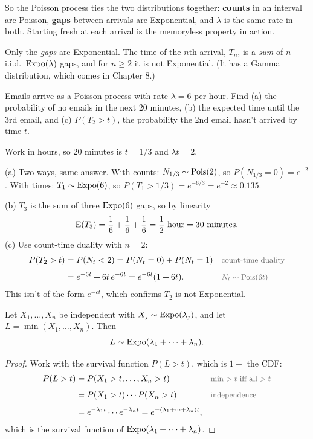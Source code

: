 \begin{remark}
So the Poisson process ties the two distributions together: \textbf{counts} in an interval are Poisson, \textbf{gaps} between arrivals are Exponential, and $\lambda$ is the same rate in both. Starting fresh at each arrival is the memoryless property in action.
\end{remark}

\begin{pitfall}
Only the \emph{gaps} are Exponential. The time of the $n$th arrival, $T_n$, is a \emph{sum} of $n$ i.i.d.\ $\operatorname{Expo}(\lambda)$ gaps, and for $n \ge 2$ it is not Exponential. (It has a Gamma distribution, which comes in Chapter 8.)
\end{pitfall}

\begin{example}\label{ex:emailproc}
Emails arrive as a Poisson process with rate $\lambda = 6$ per hour. Find (a) the probability of no emails in the next $20$ minutes, (b) the expected time until the 3rd email, and (c) $P(T_2 > t)$, the probability the 2nd email hasn't arrived by time $t$.
\end{example}
\begin{solution}
Work in hours, so $20$ minutes is $t = 1/3$ and $\lambda t = 2$.

(a) Two ways, same answer. With counts: $N_{1/3} \sim \operatorname{Pois}(2)$, so $P(N_{1/3} = 0) = e^{-2}$. With times: $T_1 \sim \operatorname{Expo}(6)$, so $P(T_1 > 1/3) = e^{-6/3} = e^{-2} \approx 0.135$.

(b) $T_3$ is the sum of three $\operatorname{Expo}(6)$ gaps, so by linearity
\[
\operatorname{E}(T_3) = \frac{1}{6} + \frac{1}{6} + \frac{1}{6} = \frac{1}{2} \text{ hour} = 30 \text{ minutes}.
\]
(c) Use count-time duality with $n = 2$:
\begin{align*}
P(T_2 > t)
  &= P(N_t < 2) = P(N_t = 0) + P(N_t = 1)
  && \by{count-time duality} \\[0.4em]
  &= e^{-6t} + 6t\,e^{-6t} = e^{-6t}(1 + 6t).
  && \by{$N_t \sim \Pois(6t)$}
\end{align*}
This isn't of the form $e^{-ct}$, which confirms $T_2$ is not Exponential.
\end{solution}

\begin{proposition}\label{prop:minexpo}
Let $X_1, \dots, X_n$ be independent with $X_j \sim \operatorname{Expo}(\lambda_j)$, and let $L = \min(X_1, \dots, X_n)$. Then
\[
L \sim \operatorname{Expo}(\lambda_1 + \cdots + \lambda_n).
\]
\end{proposition}
\begin{proof}
Work with the survival function $P(L > t)$, which is $1 -$ the CDF:
\begin{align*}
P(L > t)
  &= P(X_1 > t, \dots, X_n > t)
  && \by{min $> t$ iff all $> t$} \\[0.4em]
  &= P(X_1 > t) \cdots P(X_n > t)
  && \by{independence} \\[0.4em]
  &= e^{-\lambda_1 t} \cdots e^{-\lambda_n t}
   = e^{-(\lambda_1 + \cdots + \lambda_n)t},
\end{align*}
which is the survival function of $\operatorname{Expo}(\lambda_1 + \cdots + \lambda_n)$.
\end{proof}

